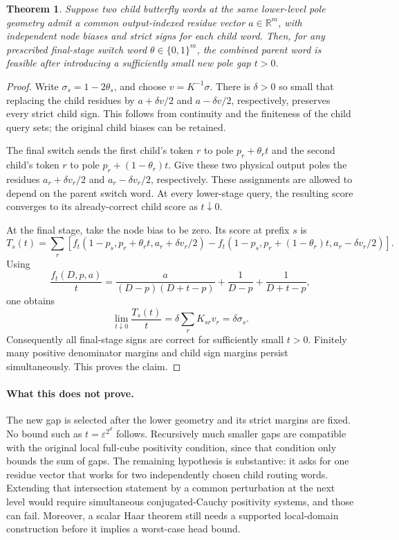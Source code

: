 \documentclass{article}
\newtheorem{theorem}{Theorem}
\begin{document}
\begin{theorem}
Suppose two child butterfly words at the same lower-level pole geometry
admit a common output-indexed residue vector $a\in\mathbb R^m$, with
independent node biases and strict signs for each child word.
Then, for any prescribed final-stage switch word
$\theta\in\{0,1\}^m$, the combined parent word is feasible after
introducing a sufficiently small new pole gap $t>0$.
\end{theorem}
\begin{proof}
Write $\sigma_s=1-2\theta_s$, and choose $v=K^{-1}\sigma$.
There is $\delta>0$ so small that replacing the child residues by
$a+\delta v/2$ and $a-\delta v/2$, respectively, preserves every strict
child sign. This follows from continuity and the finiteness of the
child query sets; the original child biases can be retained.

The final switch sends the first child's token $r$ to pole
$p_r+\theta_rt$ and the second child's token $r$ to pole
$p_r+(1-\theta_r)t$. Give these two physical output poles the residues
$a_r+\delta v_r/2$ and $a_r-\delta v_r/2$, respectively. These assignments
are allowed to depend on the parent switch word. At every lower-stage
query, the resulting score converges to its already-correct child score
as $t\downarrow0$.

At the final stage, take the node bias to be zero. Its score at prefix
$s$ is
\[
 T_s(t)=\sum_r\left[
 f_t(1-p_s,p_r+\theta_rt,a_r+\delta v_r/2)
 -f_t(1-p_s,p_r+(1-\theta_r)t,a_r-\delta v_r/2)
 \right].
\]
Using
\[
 \frac{f_t(D,p,a)}{t}
 =\frac{a}{(D-p)(D+t-p)}+
   \frac1{D-p}+\frac1{D+t-p},
\]
one obtains
\[
 \lim_{t\downarrow0}\frac{T_s(t)}t
 =\delta\sum_r K_{sr}v_r=\delta\sigma_s.
\]
Consequently all final-stage signs are correct for sufficiently small
$t>0$. Finitely many positive denominator margins and child sign
margins persist simultaneously. This proves the claim.
\end{proof}

\paragraph{What this does not prove.}
The new gap is selected after the lower geometry and its strict margins
are fixed. No bound such as $t=\varepsilon^{2^d}$ follows. Recursively
much smaller gaps are compatible with the original local full-cube
positivity condition, since that condition only bounds the sum of gaps.
The remaining hypothesis is substantive: it asks for one residue vector
that works for two independently chosen child routing words. Extending
that intersection statement by a common perturbation at the next level
would require simultaneous conjugated-Cauchy positivity systems, and
those can fail. Moreover, a scalar Haar theorem still needs a supported
local-domain construction before it implies a worst-case head bound.
\end{document}
